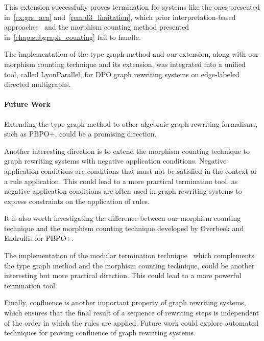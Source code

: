 \documentclass{report}
\begin{document}
This extension successfully proves termination for systems like the ones presented 
in~\autoref{ex:grs_aca} and~\autoref{rem:d3_limitation}, which prior interpretation-based approaches~\cite{zantema2014termination,bruggink2014termination,bruggink2015proving,endrullis2024generalized_arxiv_v2,overbeek2024termination_lmcs} and the morphism counting method presented in~\autoref{chap:subgraph_counting} fail to handle. 

The implementation of the type graph method and our extension, along with our morphism counting technique and its extension, was integrated into a unified tool, called LyonParallel, for DPO graph rewriting systems on edge-labeled directed multigraphs.
 
\paragraph{Future Work}

Extending the type graph method to other algebraic graph rewriting formalisms, such as PBPO+, could be a promising direction.

Another interesting direction is to extend the morphism counting technique to graph rewriting systems with negative application conditions. Negative application conditions are conditions that must not be satisfied in the context of a rule application. This could lead to a more practical termination tool, as negative application conditions are often used in graph rewriting systems to express constraints on the application of rules.

It is also worth investigating the difference between our morphism counting technique and
 the morphism counting technique developed by Overbeek and Endrullis for PBPO+. 
 
The implementation of the modular termination technique~\cite{plump2018modular} which complements the type graph method and the morphism counting technique, could be another interesting but more practical direction. This could lead to a more powerful termination tool.
  
Finally, confluence is another important property of graph rewriting systems, which ensures that the final result of a sequence of rewriting steps is independent of the order in which the rules are applied. Future work could explore automated techniques for proving confluence of graph rewriting systems.
\end{document}
